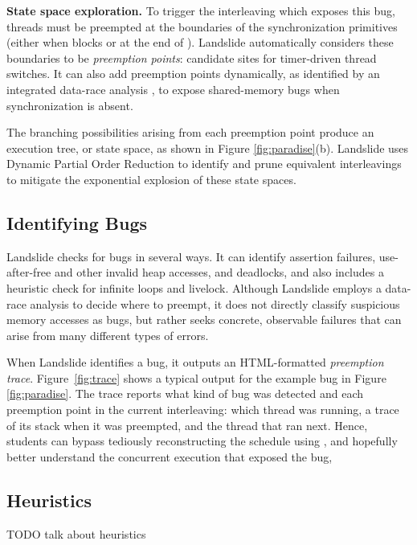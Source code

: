{\bf State space exploration.}
To trigger the interleaving which exposes this bug, threads must be preempted at the boundaries of the synchronization primitives (either when  blocks or at the end of ).
Landslide automatically considers these boundaries to be {\em preemption points}: candidate sites for timer-driven thread switches.
It can also add preemption points dynamically,
as identified by an integrated data-race analysis \cite{tsan,fasttrack},
to expose shared-memory bugs when synchronization is absent.

The branching possibilities arising from each preemption point produce an execution tree, or state space,
as shown in Figure \ref{fig:paradise}(b).
Landslide uses Dynamic Partial Order Reduction \cite{dpor} to identify and prune equivalent interleavings
to mitigate the exponential explosion of these state spaces.

\subsection{Identifying Bugs}

Landslide checks for bugs in several ways.
It can identify assertion failures, use-after-free and other invalid heap accesses, and
deadlocks, and also includes a heuristic check for infinite loops and livelock.
Although Landslide employs a data-race analysis to decide where to preempt,
it does not directly classify suspicious memory accesses as bugs,
but rather seeks concrete, observable failures that can arise from many different types of errors.


When Landslide identifies a bug, it outputs an HTML-formatted
{\em preemption trace}.
Figure~\ref{fig:trace} shows a typical output for the example bug in Figure \ref{fig:paradise}.
The trace reports what kind of bug was detected
and each preemption point in the current interleaving:
which thread was running, a trace of its stack when it was preempted, and the thread that ran next.
Hence, students can bypass tediously reconstructing the schedule using ,
and hopefully better understand the concurrent execution that exposed the bug,

\subsection{Heuristics}

TODO talk about heuristics


